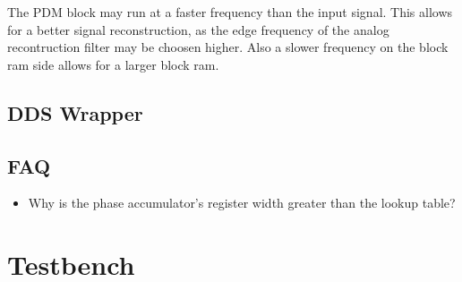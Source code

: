 \documentclass{article}
\begin{document}
The PDM block may run at a faster frequency than the input signal. This allows
for a better signal reconstruction, as the edge frequency of the analog
recontruction filter may be choosen higher. Also a slower frequency on the
block ram side allows for a larger block ram.



\subsection{DDS Wrapper}



\subsection{FAQ}

\begin{itemize}
  \item Why is the phase accumulator's register width greater than the lookup table?
\end{itemize}

\section{Testbench}
\end{document}
